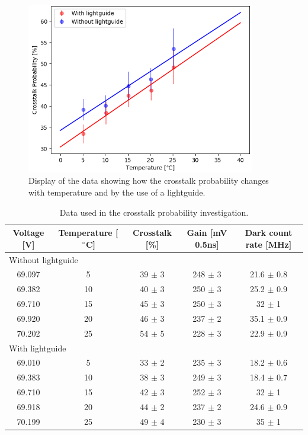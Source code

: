 \documentclass[10pt,a4paper]{article}
\begin{document}
\begin{figure}[H]
\centering
\includegraphics[width=10cm]{crosstalkplot}
\caption{Display of the data showing how the crosstalk probability changes with temperature and by the use of a lightguide.}
\label{fig3}
\end{figure}
\begin{table}[H]
\centering
\caption{Data used in the crosstalk probability investigation.}
\begin{tabular}{|c|c|c|c|c|}
\hline 
Voltage [V] & Temperature [$\degree$C] & Crosstalk [\%] & Gain [mV 0.5ns] & Dark count rate [MHz] \\ 
\hline 
 \multicolumn{5}{|l|}{Without lightguide} \\ 
\hline 
69.097 & 5 & 39 $\pm$ 3 & 248 $\pm$ 3 & 21.6 $\pm$ 0.8\\ 
\hline 
69.382 & 10 & 40 $\pm$ 3 & 250 $\pm$ 3 & 25.2 $\pm$ 0.9\\ 
\hline 
69.710 & 15 & 45 $\pm$ 3 & 250 $\pm$ 3 & 32 $\pm$ 1\\ 
\hline 
69.920 & 20 & 46 $\pm$ 3 & 237 $\pm$ 2 & 35.1 $\pm$ 0.9\\ 
\hline 
70.202 & 25 & 54 $\pm$ 5 & 228 $\pm$ 3 & 22.9 $\pm$ 0.9\\ 
\hline 
 \multicolumn{5}{|l|}{With lightguide} \\ 
\hline 
69.010 & 5 & 33 $\pm$ 2 & 235 $\pm$ 3 & 18.2 $\pm$ 0.6\\ 
\hline 
69.383 & 10 & 38 $\pm$ 3 & 249 $\pm$ 3 & 18.4 $\pm$ 0.7\\ 
\hline 
69.710 & 15 & 42 $\pm$ 3 & 252 $\pm$ 3 & 32 $\pm$ 1\\ 
\hline 
69.918 & 20 & 44 $\pm$ 2 & 237 $\pm$ 2 & 24.6 $\pm$ 0.9\\ 
\hline 
70.199 & 25 & 49 $\pm$ 4 & 230 $\pm$ 3 & 35 $\pm$ 1\\ 
\hline 
\end{tabular} 
\label{Table 3}
\end{table}
\end{document}
